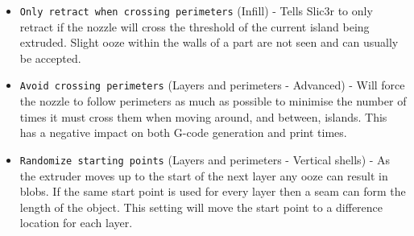 \begin{itemize}
    \item \texttt{Only retract when crossing perimeters} (Infill) - Tells Slic3r to only retract if the nozzle will cross the threshold of the current island being extruded.  Slight ooze within the walls of a part are not seen and can usually be accepted.
    \item \texttt{Avoid crossing perimeters} (Layers and perimeters - Advanced) - Will force the nozzle to follow perimeters as much as possible to minimise the number of times it must cross them when moving around, and between, islands.  This has a negative impact on both G-code generation and print times.
    \item \texttt{Randomize starting points} (Layers and perimeters - Vertical shells) - As the extruder moves up to the start of the next layer any ooze can result in blobs.  If the same start point is used for every layer then a seam can form the length of the object.  This setting will move the start point to a difference location for each layer.    
\end{itemize}
